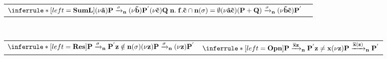 \begin{definition}
\begin{table}
\begin{tabular}{l}
      \\
      \end{tabular}
	\\\\
      \begin{tabular}{ll}
      \\
	  $\inferrule* [left=\bf{SumL}]{
	      (\nu \tilde{a}) P \xrightarrow{\sigma}_{n} (\nu \tilde{b})P^{'}
	    \\
	      (\nu \tilde{c})Q\; n.\; f.
	    \\
	      \tilde{c} \cap n(\sigma) = \emptyset
	  }{
	    (\nu \tilde{a} \tilde{c}) (P+Q) \xrightarrow{\sigma}_{n} (\nu \tilde{b} \tilde{c})P^{'}
	  }$
	&
      \\
      \end{tabular}
	\\
      \begin{tabular}{ll}
      \\
	  $\inferrule* [left=\bf{Res}]{
	      P \xrightarrow{\sigma}_{n} P^{'}
	    \\
	      z\notin n(\sigma)
	  }{
	    (\nu z) P \xrightarrow{\sigma}_{n} (\nu z) P^{'}
	  }$
	  &
	  $\inferrule* [left=\bf{Opn}]{
	      P \xrightarrow{\overline{x}z}_{n} P^{'}
	    \\ 
	      z\neq x
	  }{
	      (\nu z)P \xrightarrow{\overline{x}(z)}_{n} P^{'}
	  }$
      \\
      \end{tabular}
	\\
\end{table}
\end{definition}
